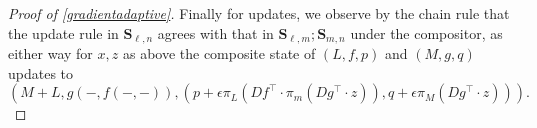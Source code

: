 \documentclass[11pt, one side, article]{memoir}
\theoremstyle{definition}
\theoremstyle{plain}
\newcommand{\Cat}[1]{\mathbf{#1}}%
\newcommand{\0}{\textsf{0}}
\newcommand{\1}{\tn{\textsf{1}}}
\renewcommand{\S}{{\Cat{S}}}
\begin{document}
\begin{proof}[Proof of \cref{gradientadaptive}]
Finally for updates, we observe by the chain rule that the update rule in $\S_{\ell,n}$ agrees with that in $\S_{\ell,m};\S_{m,n}$ under the compositor, as either way for $x,z$ as above the composite state of $(L,f,p)$ and $(M,g,q)$ updates to 
\[\left( M+L,g(-,f(-,-)),\left( p + \epsilon \pi_L (Df^\top \cdot \pi_m(Dg^\top \cdot z)),q + \epsilon \pi_M(Dg^\top \cdot z) \right) \right).\]
\end{proof}


\printbibliography 
\end{document}
